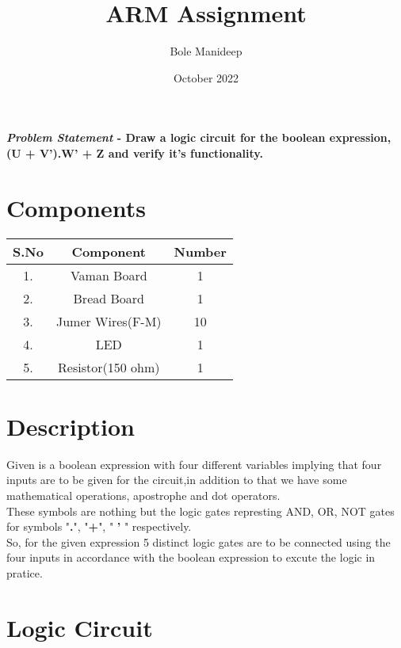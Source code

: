 \documentclass[10pt,twocolumn]{article}
\title{\textbf{ARM Assignment}}
\author{Bole Manideep}
\date{October 2022}
\begin{document}
\maketitle
\paragraph{\textit{Problem Statement} - Draw a logic circuit for the boolean expression, (U + V').W' + Z and verify it's functionality.}

\tableofcontents

\section{Components}

\begin{center}
    \setlength{\arrayrulewidth}{0.1mm}
	\setlength{\tabcolsep}{12pt}
	\renewcommand{\arraystretch}{1.5}
    \begin{tabular}{|c|c|c|}
    \hline 
    \textbf{S.No} & \textbf{Component} & \textbf{Number}\\ \hline
	1. & Vaman Board & 1 \\
	2. & Bread Board & 1 \\
	3. & Jumer Wires(F-M) & 10 \\
	4. & LED & 1 \\
	5. & Resistor(150 ohm) & 1 \\ \hline   
   \end{tabular}
\end{center}
\section{Description}
\large
Given is a boolean expression with four different
variables implying that four inputs are to be given for the
circuit,in addition to that we have some mathematical
operations, apostrophe and dot operators. \vspace{2mm} 
\\ These symbols are nothing but the logic gates
represting AND, OR, NOT gates for symbols "\textbf{.}", "\textbf{+}", " \textbf{'} " respectively. \vspace{2mm}
\\ So, for the given expression 5 distinct logic gates are to
be connected using the four inputs in accordance with the
boolean expression to excute the logic in pratice.

\section{Logic Circuit}
\end{document}
